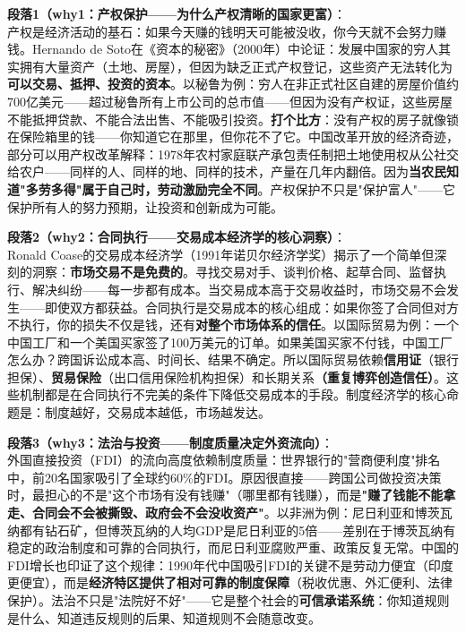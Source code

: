 \documentclass[../main.tex]{subfiles}
\begin{document}
	\textbf{段落1（why1：产权保护——为什么产权清晰的国家更富）}：\\
	产权是经济活动的基石：如果今天赚的钱明天可能被没收，你今天就不会努力赚钱。Hernando de Soto在《资本的秘密》（2000年）中论证：发展中国家的穷人其实拥有大量资产（土地、房屋），但因为缺乏正式产权登记，这些资产无法转化为\textbf{可以交易、抵押、投资的资本}。以秘鲁为例：穷人在非正式社区自建的房屋价值约700亿美元——超过秘鲁所有上市公司的总市值——但因为没有产权证，这些房屋不能抵押贷款、不能合法出售、不能吸引投资。\textbf{打个比方}：没有产权的房子就像锁在保险箱里的钱——你知道它在那里，但你花不了它。中国改革开放的经济奇迹，部分可以用产权改革解释：1978年农村家庭联产承包责任制把土地使用权从公社交给农户——同样的人、同样的地、同样的技术，产量在几年内翻倍。因为\textbf{当农民知道"多劳多得"属于自己时，劳动激励完全不同}。产权保护不只是"保护富人"——它保护所有人的努力预期，让投资和创新成为可能。

	\textbf{段落2（why2：合同执行——交易成本经济学的核心洞察）}：\\
	Ronald Coase的交易成本经济学（1991年诺贝尔经济学奖）揭示了一个简单但深刻的洞察：\textbf{市场交易不是免费的}。寻找交易对手、谈判价格、起草合同、监督执行、解决纠纷——每一步都有成本。当交易成本高于交易收益时，市场交易不会发生——即使双方都获益。合同执行是交易成本的核心组成：如果你签了合同但对方不执行，你的损失不仅是钱，还有\textbf{对整个市场体系的信任}。以国际贸易为例：一个中国工厂和一个美国买家签了100万美元的订单。如果美国买家不付钱，中国工厂怎么办？跨国诉讼成本高、时间长、结果不确定。所以国际贸易依赖\textbf{信用证}（银行担保）、\textbf{贸易保险}（出口信用保险机构担保）和长期关系\textbf{（重复博弈创造信任）}。这些机制都是在合同执行不完美的条件下降低交易成本的手段。制度经济学的核心命题是：制度越好，交易成本越低，市场越发达。

	\textbf{段落3（why3：法治与投资——制度质量决定外资流向）}：\\
	外国直接投资（FDI）的流向高度依赖制度质量：世界银行的"营商便利度"排名中，前20名国家吸引了全球约60\%的FDI。原因很直接——跨国公司做投资决策时，最担心的不是"这个市场有没有钱赚"（哪里都有钱赚），而是\textbf{"赚了钱能不能拿走、合同会不会被撕毁、政府会不会没收资产"}。以非洲为例：尼日利亚和博茨瓦纳都有钻石矿，但博茨瓦纳的人均GDP是尼日利亚的5倍——差别在于博茨瓦纳有稳定的政治制度和可靠的合同执行，而尼日利亚腐败严重、政策反复无常。中国的FDI增长也印证了这个规律：1990年代中国吸引FDI的关键不是劳动力便宜（印度更便宜），而是\textbf{经济特区提供了相对可靠的制度保障}（税收优惠、外汇便利、法律保护）。法治不只是"法院好不好"——它是整个社会的\textbf{可信承诺系统}：你知道规则是什么、知道违反规则的后果、知道规则不会随意改变。
\end{document}
